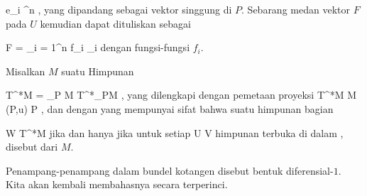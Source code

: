 \mavergleichskette
{\vergleichskette
{ e_i
}
{ \in }{ \R^n
}
{  }{
}
{    }{
}
{   }{
}
}
{}{}{,}
yang dipandang sebagai vektor singgung di $P$. Sebarang medan vektor $F$ pada $U$ kemudian dapat dituliskan sebagai

\mavergleichskette
{\vergleichskette
{ F
}
{ = }{ \sum_{i = 1}^n  f_i \partial_i
}
{  }{
}
{    }{
}
{   }{
}
}
{}{}{}
dengan fungsi-fungsi $f_i$.

{}
{

Misalkan $M$ suatu
Himpunan

\mavergleichskettedisp
{\vergleichskette
{ T^*M
}
{ =} {\biguplus_{P \in M} T^*_PM
}
{ } {
}
{ } {
}
{ } {
}
}
{}{}{,}
yang dilengkapi dengan pemetaan proyeksi
\maabbeledisp {\pi} { T^*M } { M
} { (P,u) } { P
} {,}
dan dengan
yang mempunyai sifat bahwa suatu himpunan bagian

\mavergleichskette
{\vergleichskette
{ W
}
{ \subseteq }{ T^*M
}
{  }{
}
{    }{
}
{   }{
}
}
{}{}{}
jika dan hanya jika untuk setiap
\maabbdisp {\alpha} { U } { V
} {}
himpunan
terbuka di dalam
,
disebut  dari $M$.

}
Penampang-penampang dalam bundel kotangen disebut bentuk diferensial-$1$. Kita akan kembali membahasnya secara terperinci.
